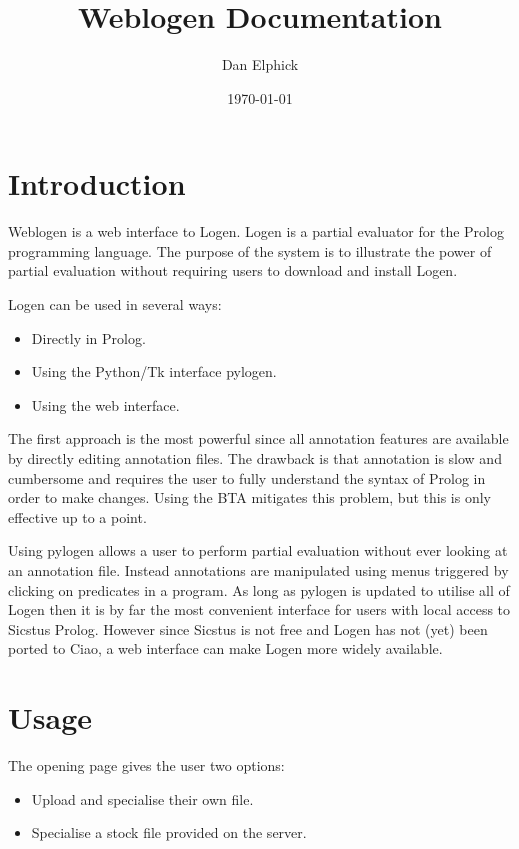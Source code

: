 \documentclass{report}
\title{Weblogen Documentation}
\author{Dan Elphick}
\date{\today}
\begin{document}
\maketitle
{}
\setcounter{page}{2}
\tableofcontents

\chapter{Introduction}

Weblogen is a web interface to Logen. Logen is a partial evaluator for the
Prolog programming language. The purpose of the system is to illustrate the
power of partial evaluation without requiring users to download and install
Logen.

Logen can be used in several ways:

\begin{itemize}
\item Directly in Prolog.
\item Using the Python/Tk interface pylogen.
\item Using the web interface.
\end{itemize}

The first approach is the most powerful since all annotation features are
available by directly editing annotation files. The drawback is that
annotation is slow and cumbersome and requires the user to fully understand
the syntax of Prolog in order to make changes. Using the BTA mitigates this
problem, but this is only effective up to a point.

Using pylogen allows a user to perform partial evaluation without ever
looking at an annotation file. Instead annotations are manipulated using
menus triggered by clicking on predicates in a program. As long as pylogen is
updated to utilise all of Logen then it is by far the most convenient
interface for users with local access to Sicstus Prolog. However since
Sicstus is not free and Logen has not (yet) been ported to Ciao, a web
interface can make Logen more widely available.

\chapter{Usage}

The opening page gives the user two options:
\begin{itemize}
\item Upload and specialise their own file.
\item Specialise a stock file provided on the server.
\end{itemize}
\end{document}
